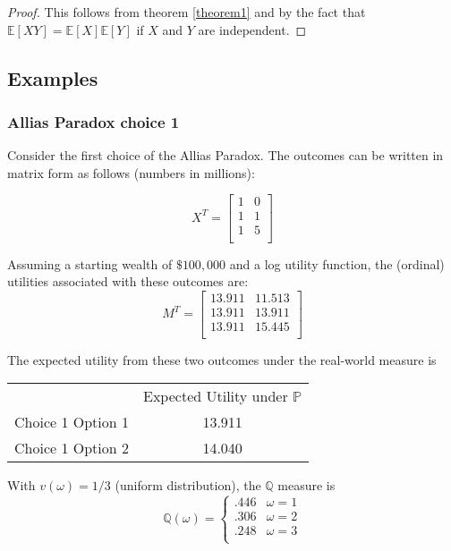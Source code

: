 \documentclass{article}
\begin{document}
\begin{proof}
This follows from theorem \ref{theorem1} and by the fact that \(\mathbb{E}[XY]=\mathbb{E}[X]\mathbb{E}[Y]\) if \(X\) and \(Y\) are independent.  
\end{proof}

\subsection{Examples}

\subsubsection{Allias Paradox choice 1}
Consider the first choice of the Allias Paradox.  The outcomes can be written in matrix form as follows (numbers in millions):

\[X^T=\begin{bmatrix}
	1 & 0  \\
	1 & 1  \\
	1 & 5  \\
\end{bmatrix}\]

Assuming a starting wealth of \(\$100,000\) and a log utility function, the (ordinal) utilities associated with these outcomes are:
\[M^T=\begin{bmatrix}
	13.911 & 11.513  \\
	13.911 & 13.911  \\
	13.911 & 15.445  \\
\end{bmatrix}\]

The expected utility from these two outcomes under the real-world measure is 

\begin{center} 
	\begin{tabular}{c c}
		& Expected Utility under \(\mathbb{P}\) \\
		Choice 1 Option 1 & 13.911 \\
		Choice 1 Option 2 & 14.040 \\
	\end{tabular}
\end{center}

With \(v(\omega)=1/3\) (uniform distribution), the \(\mathbb{Q}\) measure is
\begin{equation*}
	\mathbb{Q}(\omega) = \left\{
		\begin{array}{rl}
			.446 & \omega = 1 \\
			.306 & \omega = 2 \\
			.248 & \omega = 3 \\
		\end{array} \right.
\end{equation*}
\end{document}

